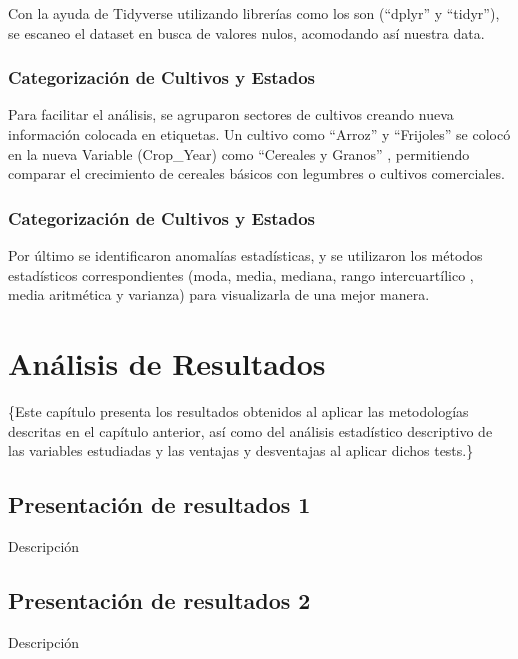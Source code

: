 \documentclass[oneside,11pt]{Latex/Classes/PhDthesisPSnPDF}
\begin{document}
Con la ayuda de Tidyverse utilizando librerías como los son (``dplyr'' y
``tidyr''), se escaneo el dataset en busca de valores nulos, acomodando
así nuestra data. ~

\subsection{Categorización de Cultivos y Estados}

Para facilitar el análisis, se agruparon sectores de cultivos creando
nueva información colocada en etiquetas. Un cultivo como ``Arroz'' y
``Frijoles'' se colocó en la nueva Variable (Crop\_Year) como ``Cereales
y Granos'' , permitiendo comparar el crecimiento de cereales básicos con
legumbres o cultivos comerciales.\\

\subsection{Categorización de Cultivos y Estados}

Por último se identificaron anomalías estadísticas, y se utilizaron los
métodos estadísticos correspondientes (moda, media, mediana, rango
intercuartílico , media aritmética y varianza) para visualizarla de una
mejor manera.\\

\chapter{Análisis de Resultados}

\{\small Este capítulo presenta los resultados obtenidos al aplicar las
metodologías descritas en el capítulo anterior, así como del análisis
estadístico descriptivo de las variables estudiadas y las ventajas y
desventajas al aplicar dichos tests.\}

\section{Presentación de resultados 1}

Descripción\\

\section{Presentación de resultados 2}

Descripción\\
\end{document}
